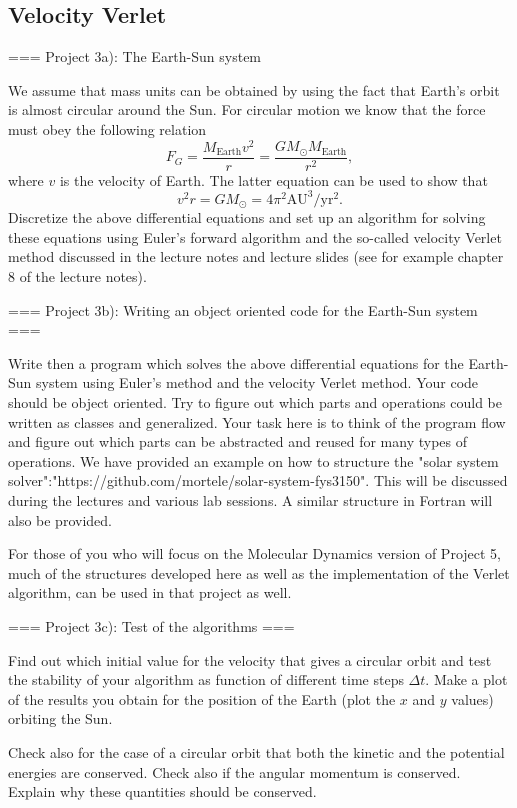 \documentclass[11pt,a4paper]{article}
\begin{document}
\subsection{Velocity Verlet}
=== Project 3a): The Earth-Sun system 

We assume that mass units can be obtained by using the fact that Earth's orbit is almost circular around the Sun.
For circular motion we know that the force must obey the following relation
\[
F_G= \frac{M_{\mathrm{Earth}}v^2}{r}=\frac{GM_{\odot}M_{\mathrm{Earth}}}{r^2},
\]
where $v$ is the velocity of Earth. 
The latter equation can be used to show that
\[
v^2r=GM_{\odot}=4\pi^2\mathrm{AU}^3/\mathrm{yr}^2.
\]
Discretize the above differential equations and set up an algorithm for solving these equations using Euler's forward algorithm and the so-called velocity Verlet method discussed in the lecture notes and lecture slides (see for example chapter 8 of the lecture notes).

=== Project 3b): Writing an object oriented code for the Earth-Sun system ===

Write then a program which solves the above differential equations for the Earth-Sun system
using Euler's  method and the velocity Verlet method. 
Your code should be object oriented. Try to figure out which parts and operations could be written as classes
and generalized.  
Your task here is to think of the program flow and figure out which parts can be abstracted and reused for many types of operations. We have provided an example on how to structure
the "solar system solver":"https://github.com/mortele/solar-system-fys3150". This will be discussed during the lectures and various lab sessions. A similar structure in Fortran will also be provided. 

For those of you who will focus on the Molecular Dynamics version of Project 5, much of the structures developed here as well as the implementation of the Verlet algorithm, can be used in that project as well.

=== Project 3c): Test of the algorithms ===

Find out which initial value for the velocity that gives a circular orbit
and test the stability of your algorithm as function of different time steps $\Delta t$. 
Make a plot of the results you obtain for the position of the Earth (plot the $x$ and $y$ values) orbiting  the Sun.

Check also for the case of a circular orbit that both the kinetic and the potential energies are conserved.
Check also if the  angular momentum is conserved. Explain why these quantities
should be conserved.
\end{document}

